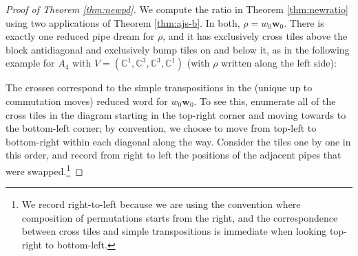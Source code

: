 \documentclass[reqno]{amsart}
\newcommand{\C}{\mathbb{C}}
\def\plaqname{plaq}%
\newcommand\plaq[2][]{
\node[bgplaq,rectangle,draw,minimum size=\loopcellsize,transform shape] (\plaqname) {};
\useasboundingbox;
\pgfkeys{/linkpattern/.cd,#1}%
\ifx#2\empty\else
\begin{scope}[x=\loopcellsize,y=\loopcellsize]
\csname plaq#2\endcsname
\end{scope}\fi
}
\newcommand\wplaq[2][]{
\node[bgplaq,rectangle,draw,fill=white,minimum size=\loopcellsize,transform shape] (\plaqname) {};
\useasboundingbox;
\pgfkeys{/linkpattern/.cd,#1}%
\ifx#2\empty\else
\begin{scope}[x=\loopcellsize,y=\loopcellsize]
\csname plaq#2\endcsname
\end{scope}\fi
}
\newcommand\gplaq[2][]{
\node[bgplaq,rectangle,draw,fill=lightgray,minimum size=\loopcellsize,transform shape] (\plaqname) {};
\useasboundingbox;
\pgfkeys{/linkpattern/.cd,#1}%
\ifx#2\empty\else
\begin{scope}[x=\loopcellsize,y=\loopcellsize]
\csname plaq#2\endcsname
\end{scope}\fi
}
\numberwithin{equation}{section}
\theoremstyle{definition}
\theoremstyle{remark}
\begin{document}
\begin{proof}[Proof of Theorem \ref{thm:newpd}] We compute the ratio in Theorem \ref{thm:newratio} using two applications of Theorem \ref{thm:ajs-b}. In both, $\rho=w_0\mathbf{w}_0$. There is exactly one reduced pipe dream for $\rho$, and it has exclusively cross tiles above the block antidiagonal and exclusively bump tiles on and below it, as in the following example for $A_4$ with $V=(\C^1,\C^3,\C^3,\C^1)$ (with $\rho$ written along the left side):
\begin{center}
\end{center}
The crosses correspond to the simple transpositions in the (unique up to commutation moves) reduced word for $w_0\mathbf{w}_0$. To see this, enumerate all of the cross tiles in the diagram starting in the top-right corner and moving towards to the bottom-left corner; by convention, we choose to move from top-left to bottom-right within each diagonal along the way. Consider the tiles one by one in this order, and record from right to left the positions of the adjacent pipes that were swapped.\footnote{We record right-to-left because we are using the convention where composition of permutations starts from the right, and the correspondence between cross tiles and simple transpositions is immediate when looking top-right to bottom-left.
}
\end{proof}
\end{document}
